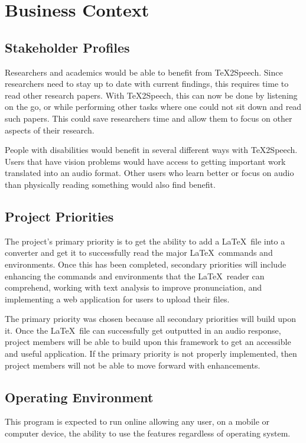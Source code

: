 
\section{Business Context}

\subsection{Stakeholder Profiles}
\par
Researchers and academics would be able to benefit from \TeX 2Speech. Since researchers need to stay up to date with current findings, this requires time to read other research papers. With \TeX 2Speech, this can now be done by listening on the go, or while performing other tasks where one could not sit down and read such papers. This could save researchers time and allow them to focus on other aspects of their research.\\
\par
\noindent People with disabilities would benefit in several different ways with \TeX 2Speech. Users that have vision problems would have access to getting important work translated into an audio format. Other users who learn better or focus on audio than physically reading something would also find benefit.

\subsection{Project Priorities}
\par
The project’s primary priority is to get the ability to add a \LaTeX\ file into a converter and get it to successfully read the major \LaTeX\ commands and environments. Once this has been completed, secondary priorities will include enhancing the commands and environments that the \LaTeX\ reader can comprehend, working with text analysis to improve pronunciation, and implementing a web application for users to upload their files.\\
\par
\noindent The primary priority was chosen because all secondary priorities will build upon it. Once the \LaTeX\ file can successfully get outputted in an audio response, project members will be able to build upon this framework to get an accessible and useful application. If the primary priority is not properly implemented, then project members will not be able to move forward with enhancements.

\subsection{Operating Environment}
This program is expected to run online allowing any user, on a mobile or computer device, the ability to use the features regardless of operating system.